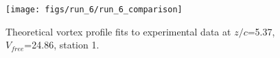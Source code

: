 \begin{figure}[H]
\centering
\texttt{[image: figs/run\_6/run\_6\_comparison]}
\caption{Theoretical vortex profile fits to experimental data at $z/c$=5.37, $V_{free}$=24.86, station 1.}
\label{fig:run_6_comparison}
\end{figure}


